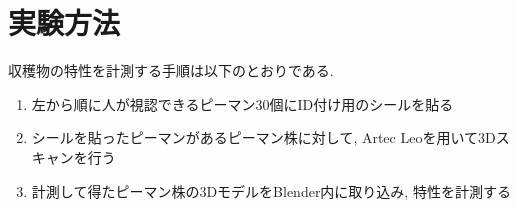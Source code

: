 \section{実験方法}
収穫物の特性を計測する手順は以下のとおりである.
\begin{enumerate}
  \item 左から順に人が視認できるピーマン30個にID付け用のシールを貼る
  \item シールを貼ったピーマンがあるピーマン株に対して, Artec Leoを用いて3Dスキャンを行う
  \item 計測して得たピーマン株の3DモデルをBlender内に取り込み, 特性を計測する
\end{enumerate}